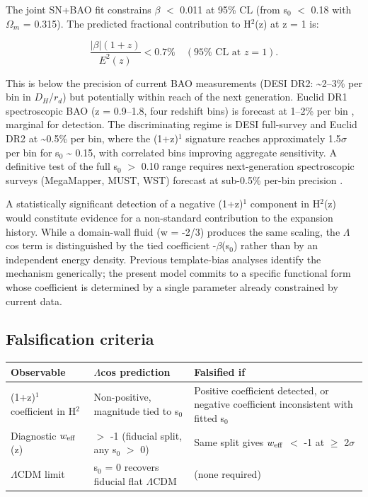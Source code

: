 The joint SN+BAO fit constrains \textbar $\beta$\textbar{} $<$ 0.011
at 95\% CL (from s$_0$ $<$ 0.18 with $\Omega_m$ = 0.315). The predicted
fractional contribution to H$^2$(z) at z = 1 is:

\[\frac{|\beta|(1+z)}{E^2(z)} < 0.7\% \quad (95\% \text{ CL at } z = 1).\]

This is below the precision of current BAO measurements (DESI DR2:
\textasciitilde2--3\% per bin in $D_H$/$r_d$) but potentially within reach
of the next generation. Euclid DR1 spectroscopic BAO (z = 0.9--1.8, four
redshift bins) is forecast at 1--2\% per bin \cite{ref16}, marginal for
detection. The discriminating regime is DESI full-survey and Euclid DR2
at \textasciitilde0.5\% per bin, where the (1+z)$^1$ signature reaches
approximately 1.5$\sigma$ per bin for s$_0$ \textasciitilde{} 0.15, with
correlated bins improving aggregate sensitivity. A definitive test of
the full s$_0$ $>$ 0.10 range requires next-generation
spectroscopic surveys (MegaMapper, MUST, WST) forecast at sub-0.5\%
per-bin precision \cite{ref17}.

A statistically significant detection of a negative (1+z)$^1$ component in
H$^2$(z) would constitute evidence for a non-standard contribution to the
expansion history. While a domain-wall fluid (w = -2/3) produces the
same scaling, the $\Lambda$cos term is distinguished by the tied coefficient
-$\beta$(s$_0$) rather than by an independent energy density. Previous
template-bias analyses identify the mechanism generically; the present
model commits to a specific functional form whose coefficient is
determined by a single parameter already constrained by current data.

\subsection{Falsification criteria}\label{sec:falsification}

{\def\LTcaptype{none} %
\begin{table}[!htb]
\centering\footnotesize
\begin{tabular}{@{}lll@{}}
\toprule
Observable & $\Lambda$cos prediction & Falsified if \\
\midrule

(1+z)$^1$ coefficient in H$^2$ & Non-positive, magnitude tied to s$_0$ & Positive
coefficient detected, or negative coefficient inconsistent with fitted
s$_0$ \\
Diagnostic $w_{\rm eff}$(z) & $>$ -1 (fiducial split, any s$_0$
$>$ 0) & Same split gives $w_{\rm eff}$ $<$ -1 at $\geq$ 2$\sigma$ \\
$\Lambda$CDM limit & s$_0$ = 0 recovers fiducial flat $\Lambda$CDM & (none required) \\
\bottomrule
\end{tabular}
\end{table}
}

